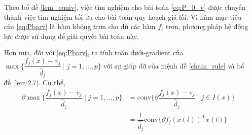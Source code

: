 Theo bổ đề \ref{lem_equiv}, việc tìm nghiệm cho bài toán \ref{eq:P_0_v} được chuyển thành việc tìm nghiệm tối ưu cho bài toán quy hoạch giả lồi.  Vì hàm mục tiêu của \ref{eq:Pbarv} là hàm không trơn cho dù các hàm ${f_i}$ trơn, phương pháp hệ động lực được sử dụng để giải quyết bài toán này. 





Hơn nữa, đối với \ref{eq:Pbarv}, ta tính toán dưới-gradient của $\max\{\dfrac{f_{j}(x)-v_{j}}{\hat{d}_{j}}\mid j=1,...,p\}$ với sự giúp đỡ của mệnh đề \ref{chain_rule} và bổ đề \ref{lem:2.7}. Cụ thể,
\begin{align}
    \partial \max\{\dfrac{f_{j}(x)-v_{j}}{\hat{d}_{j}}\mid j=1,...,p\} &= \text{conv} \{\partial \dfrac{f_{j}(x)-v_{j}}{\hat{d}_{j}}\mid j\in I(x) \} \\
    & = \dfrac{1}{\hat{d_j}}\text{conv} \{\partial f_j(x(t))^\mathrm{T}\dot{x}(t) \}
\end{align}

